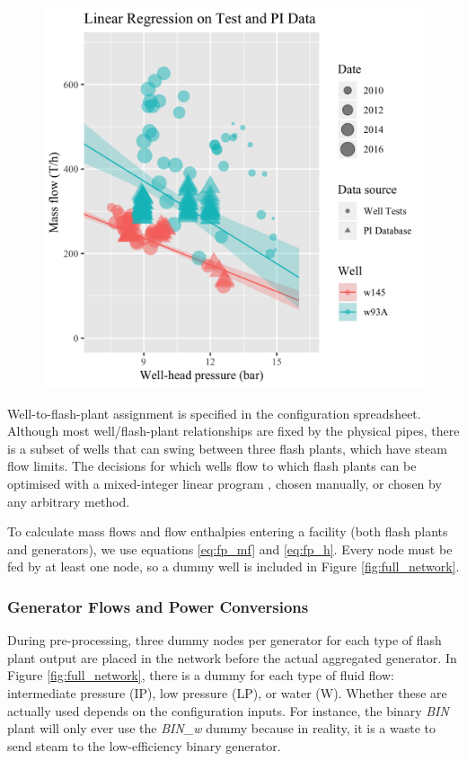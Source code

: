 \documentclass[a4paper, 12pt]{article}
\begin{document}
\begin{figure}
\begin{minipage}[t]{.48\textwidth}
  \includegraphics[width=\linewidth]{media/production_curve}
  \label{fig:production_curve}
\end{minipage}
\end{figure}

Well-to-flash-plant assignment is specified in the configuration spreadsheet. Although most well/flash-plant relationships are fixed by the physical pipes, there is a subset of wells that can swing between three flash plants, which have steam flow limits. The decisions for which wells flow to which flash plants can be optimised with a mixed-integer linear program \cite{Fox:2018}, chosen manually, or chosen by any arbitrary method.

To calculate mass flows and flow enthalpies entering a facility (both flash plants and generators), we use equations \ref{eq:fp_mf} and \ref{eq:fp_h}. Every node must be fed by at least one node, so a dummy well is included in Figure \ref{fig:full_network}.

\subsubsection{Generator Flows and Power Conversions}
During pre-processing, three dummy nodes per generator for each type of flash plant output are placed in the network before the actual aggregated generator. In Figure \ref{fig:full_network}, there is a dummy for each type of fluid flow: intermediate pressure (IP), low pressure (LP), or water (W). Whether these are actually used depends on the configuration inputs. For instance, the binary \emph{BIN} plant will only ever use the \emph{BIN\_w} dummy because in reality, it is a waste to send steam to the low-efficiency binary generator.
\end{document}
